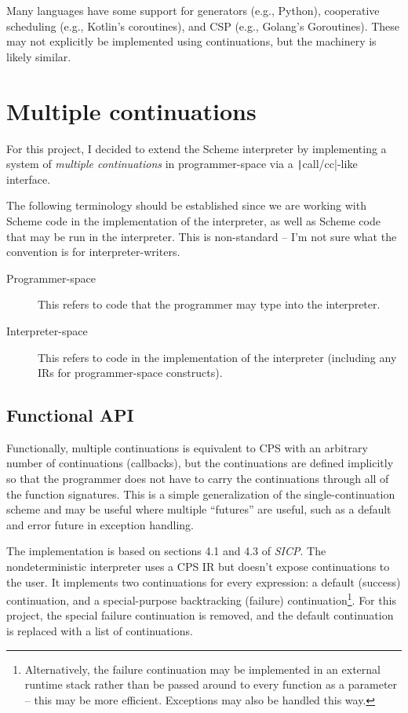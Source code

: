 \documentclass[]{article}
\begin{document}
Many languages have some support for generators (e.g., Python), cooperative scheduling (e.g., Kotlin's coroutines), and CSP (e.g., Golang's Goroutines). These may not explicitly be implemented using continuations, but the machinery is likely similar.

\section{Multiple continuations}
\label{sec:mulc}

For this project, I decided to extend the Scheme interpreter by implementing a system of \textit{multiple continuations} in programmer-space via a \texttt|call/cc|-like interface.

The following terminology should be established since we are working with Scheme code in the implementation of the interpreter, as well as Scheme code that may be run in the interpreter. This is non-standard -- I'm not sure what the convention is for interpreter-writers.
\begin{description}
\item[Programmer-space] This refers to code that the programmer may type into the interpreter.
\item[Interpreter-space] This refers to code in the implementation of the interpreter (including any IRs for programmer-space constructs).
\end{description}

\subsection{Functional API}
\label{sec:func}

Functionally, multiple continuations is equivalent to CPS with an arbitrary number of continuations (callbacks), but the continuations are defined implicitly so that the programmer does not have to carry the continuations through all of the function signatures. This is a simple generalization of the single-continuation scheme and may be useful where multiple ``futures'' are useful, such as a default and error future in exception handling.

The implementation is based on sections 4.1 and 4.3 of \textit{SICP}. The nondeterministic interpreter uses a CPS IR but doesn't expose continuations to the user. It implements two continuations for every expression: a default (success) continuation, and a special-purpose backtracking (failure) continuation\footnote{Alternatively, the failure continuation may be implemented in an external runtime stack rather than be passed around to every function as a parameter -- this may be more efficient. Exceptions may also be handled this way.}. For this project, the special failure continuation is removed, and the default continuation is replaced with a list of continuations.
\end{document}
